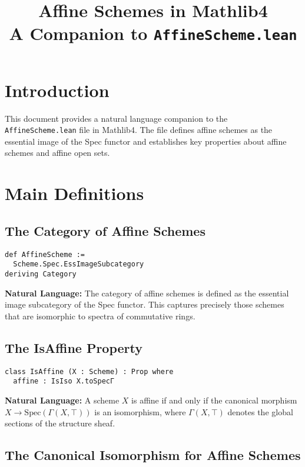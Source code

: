 \documentclass{article}
\title{Affine Schemes in Mathlib4\\
\large A Companion to \texttt{AffineScheme.lean}}
\author{}
\date{}
\theoremstyle{definition}
\begin{document}
\maketitle

\section{Introduction}

This document provides a natural language companion to the \texttt{AffineScheme.lean} file in Mathlib4. The file defines affine schemes as the essential image of the Spec functor and establishes key properties about affine schemes and affine open sets.

\section{Main Definitions}

\subsection{The Category of Affine Schemes}

\begin{lstlisting}
def AffineScheme :=
  Scheme.Spec.EssImageSubcategory
deriving Category
\end{lstlisting}

\textbf{Natural Language:} The category of affine schemes is defined as the essential image subcategory of the Spec functor. This captures precisely those schemes that are isomorphic to spectra of commutative rings.

\subsection{The IsAffine Property}

\begin{lstlisting}
class IsAffine (X : Scheme) : Prop where
  affine : IsIso X.toSpecΓ
\end{lstlisting}

\textbf{Natural Language:} A scheme $X$ is affine if and only if the canonical morphism $X \to \mathrm{Spec}(\Gamma(X, \top))$ is an isomorphism, where $\Gamma(X, \top)$ denotes the global sections of the structure sheaf.

\subsection{The Canonical Isomorphism for Affine Schemes}
\end{document}
